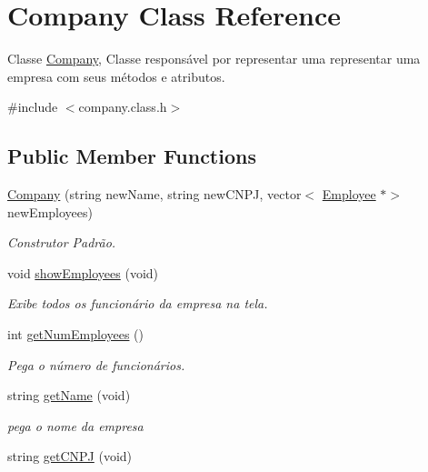 \hypertarget{classCompany}{}\section{Company Class Reference}
\label{classCompany}


Classe \hyperlink{classCompany}{Company}, Classe responsável por representar uma representar uma empresa com seus métodos e atributos.  




{\ttfamily \#include $<$company.\+class.\+h$>$}

\subsection*{Public Member Functions}
\begin{DoxyCompactItemize}
\item 
\hyperlink{classCompany_afc2d545cb430385b2819688c67e38b39}{Company} (string new\+Name, string new\+C\+N\+PJ, vector$<$ \hyperlink{classEmployee}{Employee} $\ast$$>$ new\+Employees)
\begin{DoxyCompactList}\small\item\em Construtor Padrão. \end{DoxyCompactList}\item 
\mbox{\label{classCompany_a84d2df92dd22ba9b4142996d14dbecd2}} 
void \hyperlink{classCompany_a84d2df92dd22ba9b4142996d14dbecd2}{show\+Employees} (void)
\begin{DoxyCompactList}\small\item\em Exibe todos os funcionário da empresa na tela. \end{DoxyCompactList}\item 
int \hyperlink{classCompany_a8f8e8e00fbd5c1da80a39adab3f1bd38}{get\+Num\+Employees} ()
\begin{DoxyCompactList}\small\item\em Pega o número de funcionários. \end{DoxyCompactList}\item 
string \hyperlink{classCompany_a8f1ee72530d6071134dbe1191c6aa890}{get\+Name} (void)
\begin{DoxyCompactList}\small\item\em pega o nome da empresa \end{DoxyCompactList}\item 
string \hyperlink{classCompany_a6782268853d92085edbb3323d4bc72c5}{get\+C\+N\+PJ} (void)
$$
\end{DoxyCompactItemize}
